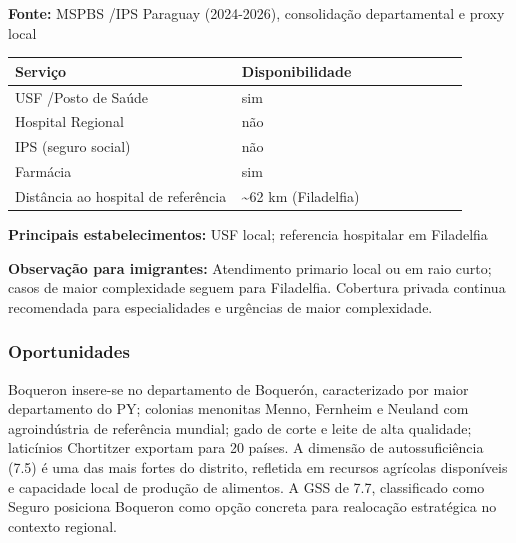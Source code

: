 \textbf{Fonte:} MSPBS /\allowbreak  IPS Paraguay (2024-2026), consolidação
departamental e proxy local

{\def\LTcaptype{none} %
\begin{longtable}{@{}>{\raggedright\arraybackslash}p{0.45\linewidth} >{\raggedright\arraybackslash}p{0.45\linewidth}@{}}
\toprule\noalign{}
Serviço & Disponibilidade \\
\midrule\noalign{}
\endhead
\bottomrule\noalign{}
\endlastfoot
USF /\allowbreak  Posto de Saúde & sim \\
Hospital Regional & não \\
IPS (seguro social) & não \\
Farmácia & sim \\
Distância ao hospital de referência & \textasciitilde62 km
(Filadelfia) \\
\end{longtable}
}

\textbf{Principais estabelecimentos:} USF local; referencia hospitalar
em Filadelfia

\textbf{Observação para imigrantes:} Atendimento primario local ou em
raio curto; casos de maior complexidade seguem para Filadelfia.
Cobertura privada continua recomendada para especialidades e urgências
de maior complexidade.
\newpage

\subsubsection*{Oportunidades}\label{oport-boqueron-1606}
Boqueron insere-se no departamento de Boquerón, caracterizado por maior departamento do PY; colonias menonitas Menno, Fernheim e Neuland com agroindústria de referência mundial; gado de corte e leite de alta qualidade; laticínios Chortitzer exportam para 20 países. A dimensão de autossuficiência (7.5) é uma das mais fortes do distrito, refletida em recursos agrícolas disponíveis e capacidade local de produção de alimentos. A GSS de 7.7, classificado como Seguro posiciona Boqueron como opção concreta para realocação estratégica no contexto regional.

